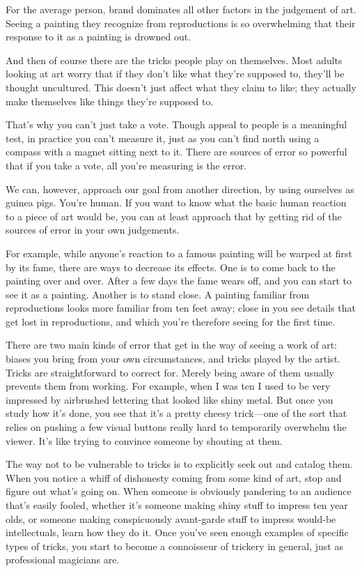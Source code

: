 \documentclass[12pt]{book}
\begin{document}
For the average person, brand dominates all other factors in the
judgement of art. Seeing a painting they recognize from reproductions is
so overwhelming that their response to it as a painting is drowned out.

And then of course there are the tricks people play on themselves. Most
adults looking at art worry that if they don't like what they're
supposed to, they'll be thought uncultured. This doesn't just affect
what they claim to like; they actually make themselves like things
they're supposed to.

That's why you can't just take a vote. Though appeal to people is a
meaningful test, in practice you can't measure it, just as you can't
find north using a compass with a magnet sitting next to it. There are
sources of error so powerful that if you take a vote, all you're
measuring is the error.

We can, however, approach our goal from another direction, by using
ourselves as guinea pigs. You're human. If you want to know what the
basic human reaction to a piece of art would be, you can at least
approach that by getting rid of the sources of error in your own
judgements.

For example, while anyone's reaction to a famous painting will be warped
at first by its fame, there are ways to decrease its effects. One is to
come back to the painting over and over. After a few days the fame wears
off, and you can start to see it as a painting. Another is to stand
close. A painting familiar from reproductions looks more familiar from
ten feet away; close in you see details that get lost in reproductions,
and which you're therefore seeing for the first time.

There are two main kinds of error that get in the way of seeing a work
of art: biases you bring from your own circumstances, and tricks played
by the artist. Tricks are straightforward to correct for. Merely being
aware of them usually prevents them from working. For example, when I
was ten I used to be very impressed by airbrushed lettering that looked
like shiny metal. But once you study how it's done, you see that it's a
pretty cheesy trick---one of the sort that relies on pushing a few
visual buttons really hard to temporarily overwhelm the viewer. It's
like trying to convince someone by shouting at them.

The way not to be vulnerable to tricks is to explicitly seek out and
catalog them. When you notice a whiff of dishonesty coming from some
kind of art, stop and figure out what's going on. When someone is
obviously pandering to an audience that's easily fooled, whether it's
someone making shiny stuff to impress ten year olds, or someone making
conspicuously avant-garde stuff to impress would-be intellectuals, learn
how they do it. Once you've seen enough examples of specific types of
tricks, you start to become a connoisseur of trickery in general, just
as professional magicians are.
\end{document}
